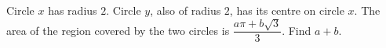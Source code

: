 Circle $x$ has radius $2$. Circle $y$, also of radius $2$, has its centre on circle $x$. The area of the region covered by the two circles is $\dfrac{a\pi+b\sqrt3}3$. Find $a+b$.
